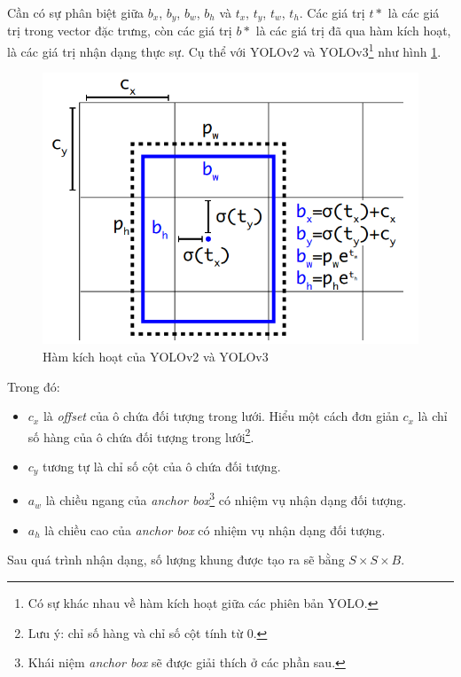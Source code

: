 \documentclass[../thesis.tex]{subfiles}
\begin{document}
Cần có sự phân biệt giữa $b_x$, $b_y$, $b_w$, $b_h$ và $t_x$, $t_y$, $t_w$, $t_h$. Các giá trị $t*$ là các giá trị trong vector đặc trưng, còn các giá trị $b*$ là các giá trị đã qua hàm kích hoạt, là các giá trị nhận dạng thực sự. Cụ thể với YOLOv2 và YOLOv3\footnote{Có sự khác nhau về hàm kích hoạt giữa các phiên bản YOLO.} như hình \ref{transform_feature_map}.

\begin{figure}[H]
    \centering
    \includegraphics[width=0.5\linewidth]{images/transform_feature_map.png}
    \caption{Hàm kích hoạt của YOLOv2 và YOLOv3}
    \label{transform_feature_map}
\end{figure}

Trong đó:

\begin{itemize}[topsep=0pt]
    \item $c_x$ là \textit{offset} của ô chứa đối tượng trong lưới. Hiểu một cách đơn giản $c_x$ là chỉ số hàng của ô chứa đối tượng trong lưới\footnote{Lưu ý: chỉ số hàng và chỉ số cột tính từ 0.}.
    \item $c_y$ tương tự là chỉ số cột của ô chứa đối tượng.
    \item $a_w$ là chiều ngang của \textit{anchor box}\footnote{Khái niệm \textit{anchor box} sẽ được giải thích ở các phần sau.} có nhiệm vụ nhận dạng đối tượng.
    \item $a_h$ là chiều cao của \textit{anchor box} có nhiệm vụ nhận dạng đối tượng.
\end{itemize}

Sau quá trình nhận dạng, số lượng khung được tạo ra sẽ bằng $S\times S\times B$. 
\end{document}
